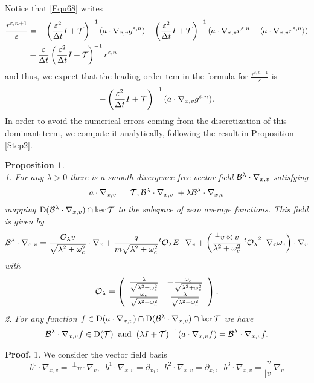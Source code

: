 \documentclass[12pt, a4paper]{article}
\newcommand{\red}{\textcolor{red!95!black}}
\newtheorem{pro}{Proposition}[section]
\newcounter{steps}
\newenvironment{proof}[1][]{%
\par\medbreak\setcounter{steps}{0}
{\noindent\bfseries Proof#1. }} {\hfill\fbox{\ }\medbreak}
\newcommand{\bl}[0]{
{\cal B}^\lambda}
\newcommand{\ol}[0]{
{\cal O}_\lambda}
\newcommand{\radlo}[0]{
\sqrt{\lambda ^2 + \omega _c ^2}}
\newcommand{\eps}[0]{
\varepsilon}
\newcommand{\ren}[0]{
r ^{\varepsilon, n}}
\newcommand{\renpo}[0]{
r ^{\varepsilon, n + 1}}
\newcommand{\gen}[0]{
g ^{\varepsilon, n}}
\newcommand{\nxv}[0]{
\nabla_{x,v}}
\newcommand{\ave}[1]{
\left \langle #1 \right \rangle }
\newcommand{\D}[0]{
\mathrm{D}}
\begin{document}
\red{
Notice that \eqref{Equ68} writes 
\begin{align}
\label{EquExactExp}
\frac{\renpo}{\eps} & = - \left ( \frac{\eps ^2}{\Delta t}I + {\cal T}\right ) ^{-1} ( a \cdot \nxv \gen) - \left ( \frac{\eps ^2}{\Delta t}I + {\cal T}\right ) ^{-1} ( a \cdot \nxv \ren - \ave{a \cdot \nxv \ren } ) \nonumber \\
&  + \frac{\eps}{\Delta t } \left ( \frac{\eps ^2}{\Delta t}I + {\cal T}\right ) ^{-1} \ren
\end{align}
and thus, we expect that the leading order tem in the formula for $\frac{\renpo}{\eps}$ is 
\[
- \left ( \frac{\eps ^2}{\Delta t}I + {\cal T}\right ) ^{-1} (a\cdot \nxv \gen).
\]
In order to avoid the numerical errors coming from the discretization of this dominant term, we compute it analytically, following the result in Proposition \ref{Step2}.
\begin{pro}
\label{Step2Bis}
$\;$\\
1. For any $\lambda >0$ there is a smooth divergence free vector field $\bl \cdot \nxv $ satisfying
\begin{equation}
\label{EquLambdaDecomp}
a\cdot \nxv = [{\cal T}, \bl \cdot \nxv] + \lambda \bl \cdot \nxv
\end{equation}
mapping $\D ( \bl \cdot \nxv ) \cap \ker {\cal T} $ to the subspace of zero average functions. This field is given by
\begin{equation}
\label{EquExpressionBLambda}
\bl \cdot \nxv =  \frac{\ol v}{\radlo}\cdot \nabla _x + \frac{q}{m \radlo} {^t \ol }E \cdot \nabla _v + \left ( \frac{{^\perp v} \otimes v }{\lambda ^2 + \omega _c ^2} \;{^t \ol} ^2 \;\;\nabla _x \omega _c \right ) \cdot \nabla _v
\end{equation}
with 
\[
\ol = \left(
\begin{array}{cc}
\frac{\lambda}{\radlo}   & - \frac{\omega _c}{\radlo}    \\
\frac{\omega _c}{\radlo}  &   \frac{\lambda}{\radlo}    
\end{array}
\right).
\]
2. For any function $f \in \D ( a \cdot \nxv ) \cap \D (\bl \cdot \nxv ) \cap \ker {\cal T}$ we have
\[
\bl \cdot \nxv f \in \D ({\cal T})\;\;\mbox{and} \;\; (\lambda I + {\cal T})^{-1} (a \cdot \nxv f) = \bl \cdot \nxv f.
\]
\end{pro}
\begin{proof}
1. We consider the vector field basis
\[
b^0 \cdot \nxv = \;{^\perp v \cdot \nabla _v},\;\;b^1 \cdot \nxv = \partial _{x_1},\;\;b^2 \cdot \nxv = \partial _{x_2},\;\;b^3 \cdot \nxv = \frac{v}{|v|} \nabla _v
\]
\end{proof}}
\end{document}
